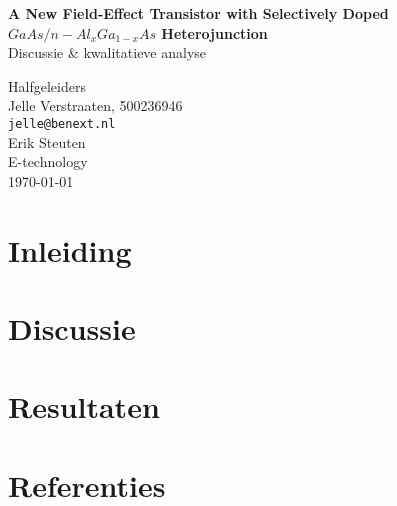\documentclass[11pt]{report}
\newlength{\leftbarwidth}
\newlength{\leftbarsep}
\newcommand*{\leftbarcolorcmd}{\color{leftbarcolor}}%
\renewenvironment{leftbar}{%
    \def\FrameCommand{{\leftbarcolorcmd{\vrule width \leftbarwidth\relax\hspace {\leftbarsep}}}}%
    \MakeFramed {\advance \hsize -\width \FrameRestore }}{\endMakeFramed}
\begin{document}
\begin{titlepage}
\begin{center}
{\huge\bfseries A New Field-Effect Transistor with Selectively Doped $GaAs/n-Al_{x}Ga_{1-x}As$ Heterojunction}
\\ \bigskip
{\Large Discussie \& kwalitatieve analyse}
\end{center}
\vfill
\begin{flushleft}
\setlength{\leftbarwidth}{1pt}
\begin{leftbar}
Halfgeleiders \\
Jelle Verstraaten, 500236946 \\
\texttt{jelle@benext.nl} \\
Erik Steuten\\
E-technology \\
{\small \today} \\
\end{leftbar}
\end{flushleft}
\end{titlepage}

\tableofcontents

\chapter{Inleiding}

\chapter{Discussie}

\chapter{Resultaten}

\chapter{Referenties}




\appendix
\end{document}
